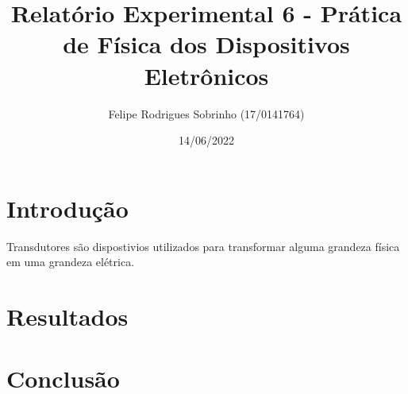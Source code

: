 \documentclass[12pt, onecolumn]{IEEEtran}
\title{Relatório Experimental 6 - Prática de Física dos Dispositivos Eletrônicos}
\author{Felipe Rodrigues Sobrinho (17/0141764)}
\date{14/06/2022}
\begin{document}
\maketitle

\section{Introdução}

Transdutores são dispostivios utilizados para transformar alguma grandeza física em uma grandeza elétrica.

\section{Resultados}

\section{Conclusão}
\end{document}
